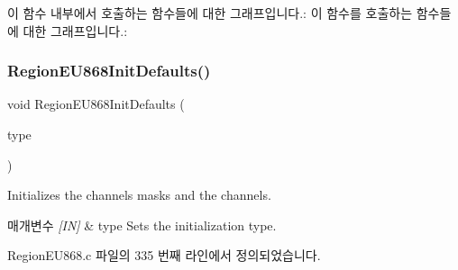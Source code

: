 이 함수 내부에서 호출하는 함수들에 대한 그래프입니다.\+:
이 함수를 호출하는 함수들에 대한 그래프입니다.\+:
\mbox{\label{group___r_e_g_i_o_n_e_u868_ga3e8ada4579aff33ad74ca34513d64893}} 
\subsubsection{\texorpdfstring{Region\+E\+U868\+Init\+Defaults()}{RegionEU868InitDefaults()}}
{\footnotesize\ttfamily void Region\+E\+U868\+Init\+Defaults (\begin{DoxyParamCaption}\item[{\mbox{\hyperlink{group___r_e_g_i_o_n_gaddc73ae10673ec925724e7870363bda9}{Init\+Type\+\_\+t}}}]{type }\end{DoxyParamCaption})}



Initializes the channels masks and the channels. 


\begin{DoxyParams}{매개변수}
{\em \mbox{[}\+I\+N\mbox{]}} & type Sets the initialization type. \\
\hline
\end{DoxyParams}


Region\+E\+U868.\+c 파일의 335 번째 라인에서 정의되었습니다.


